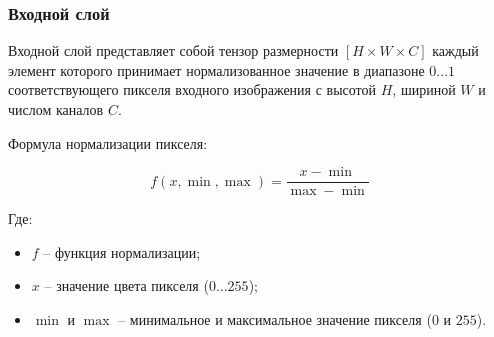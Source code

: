 \subsubsection{Входной слой}

Входной слой представляет собой тензор размерности $\left[H\times W\times C\right]$ каждый элемент которого принимает нормализованное значение в диапазоне $0...1$ соответствующего пикселя входного изображения с высотой $H$, шириной $W$ и числом каналов $C$. 

Формула нормализации пикселя:

$$
f(x, \min, \max) = \frac{x-\min}{\max - \min}
$$

Где:
\begin{itemize}
    \item $f$ -- функция нормализации;
    \item $x$ -- значение цвета пикселя ($0...255$);
    \item $\min$ и $\max$ -- минимальное и максимальное значение пикселя ($0$ и $255$).
\end{itemize}
